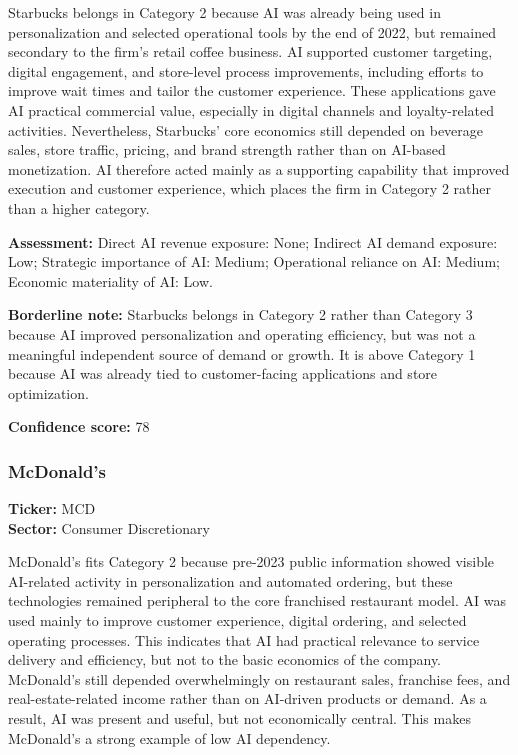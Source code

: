 \documentclass{article}
\begin{document}
Starbucks belongs in Category 2 because AI was already being used in personalization and selected operational tools by the end of 2022, but remained secondary to the firm’s retail coffee business. AI supported customer targeting, digital engagement, and store-level process improvements, including efforts to improve wait times and tailor the customer experience. These applications gave AI practical commercial value, especially in digital channels and loyalty-related activities. Nevertheless, Starbucks’ core economics still depended on beverage sales, store traffic, pricing, and brand strength rather than on AI-based monetization. AI therefore acted mainly as a supporting capability that improved execution and customer experience, which places the firm in Category 2 rather than a higher category.

\textbf{Assessment:} Direct AI revenue exposure: None; Indirect AI demand exposure: Low; Strategic importance of AI: Medium; Operational reliance on AI: Medium; Economic materiality of AI: Low.

\textbf{Borderline note:} Starbucks belongs in Category 2 rather than Category 3 because AI improved personalization and operating efficiency, but was not a meaningful independent source of demand or growth. It is above Category 1 because AI was already tied to customer-facing applications and store optimization.

\textbf{Confidence score:} 78

\subsubsection*{McDonald's}
\textbf{Ticker:} MCD \\
\textbf{Sector:} Consumer Discretionary

McDonald's fits Category 2 because pre-2023 public information showed visible AI-related activity in personalization and automated ordering, but these technologies remained peripheral to the core franchised restaurant model. AI was used mainly to improve customer experience, digital ordering, and selected operating processes. This indicates that AI had practical relevance to service delivery and efficiency, but not to the basic economics of the company. McDonald's still depended overwhelmingly on restaurant sales, franchise fees, and real-estate-related income rather than on AI-driven products or demand. As a result, AI was present and useful, but not economically central. This makes McDonald's a strong example of low AI dependency.
\end{document}
